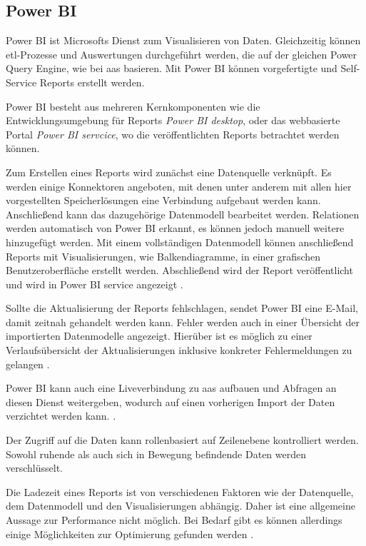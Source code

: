 \subsection{Power BI} \label{sec:grundlagen:azure_dienste:powerBI}
Power BI ist Microsofts Dienst zum Visualisieren von Daten. Gleichzeitig können \ac{etl}-Prozesse und Auswertungen durchgeführt werden, die auf der gleichen Power Query Engine, wie bei \ac{aas} basieren. Mit Power BI können vorgefertigte und Self-Service Reports erstellt werden.

Power BI besteht aus mehreren Kernkomponenten wie die Entwicklungsumgebung für Reports \textit{Power BI desktop}, oder das webbasierte Portal \textit{Power BI servcice}, wo die veröffentlichten Reports betrachtet werden können.

Zum Erstellen eines Reports wird zunächst eine Datenquelle verknüpft. Es werden einige Konnektoren angeboten, mit denen unter anderem mit allen hier vorgestellten Speicherlösungen eine Verbindung aufgebaut werden kann. Anschließend kann das dazugehörige Datenmodell bearbeitet werden. Relationen werden automatisch von Power BI erkannt, es können jedoch manuell weitere hinzugefügt werden. Mit einem vollständigen Datenmodell können anschließend Reports mit Visualisierungen, wie Balkendiagramme, in einer grafischen Benutzeroberfläche erstellt werden. Abschließend wird der Report veröffentlicht und wird in Power BI service angezeigt \cite{how_beyond_2020}.

Sollte die Aktualisierung der Reports fehlschlagen, sendet Power BI eine E-Mail, damit zeitnah gehandelt werden kann. Fehler werden auch in einer Übersicht der importierten Datenmodelle angezeigt. Hierüber ist es möglich zu einer Verlaufsübersicht der Aktualisierungen inklusive konkreter Fehlermeldungen zu gelangen \cite{iseminger_data_2021}.

Power BI kann auch eine Liveverbindung zu \ac{aas} aufbauen und Abfragen an diesen Dienst weitergeben, wodurch auf einen vorherigen Import der Daten verzichtet werden kann.
\cite{how_beyond_2020}.

Der Zugriff auf die Daten kann rollenbasiert auf Zeilenebene kontrolliert werden. Sowohl ruhende als auch sich in Bewegung befindende Daten werden verschlüsselt.

Die Ladezeit eines Reports ist von verschiedenen Faktoren wie der Datenquelle, dem Datenmodell und den Visualisierungen abhängig. Daher ist eine allgemeine Aussage zur Performance nicht möglich. Bei Bedarf gibt es können allerdings einige Möglichkeiten zur Optimierung gefunden werden \cite[vgl.][]{myers_optimization_2021}.

